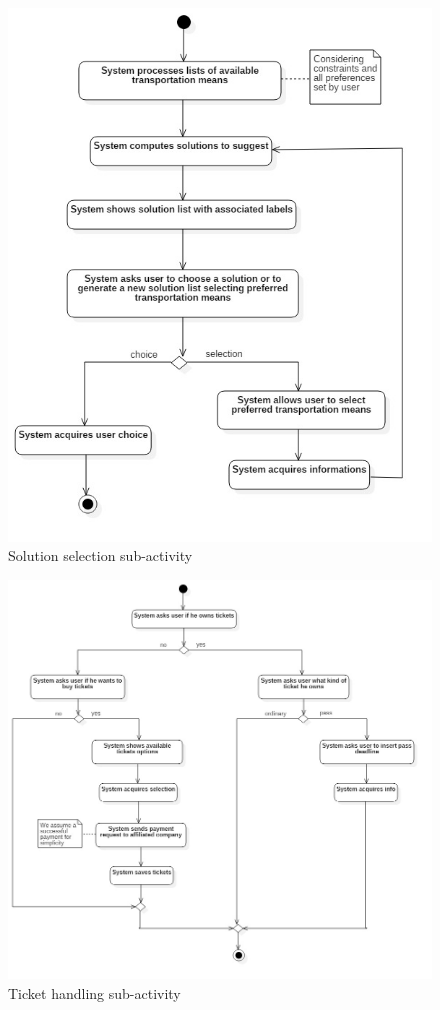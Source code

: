 		\begin{figure}[H]
			\centerline{\includegraphics[height=0.35\paperheight]{Images/SolutionSelectionAD}}
			\caption{Solution selection sub-activity}
		\end{figure}
		\begin{figure}[H]
			\centerline{\includegraphics[height=0.35\paperheight]{Images/TicketHandlingAD}}
			\caption{Ticket handling sub-activity}
		\end{figure}

